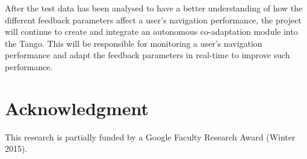 \documentclass[letterpaper]{article}
\begin{document}
After the test data has been analysed to have a better understanding of how the different feedback parameters affect a user's navigation performance, the project will continue to create and integrate an autonomous co-adaptation module into the Tango. This will be responsible for monitoring a user's navigation performance and adapt the feedback parameters in real-time to improve such performance.

\section*{Acknowledgment}

This research is partially funded by a Google Faculty Research Award (Winter 2015). 



\end{document}
